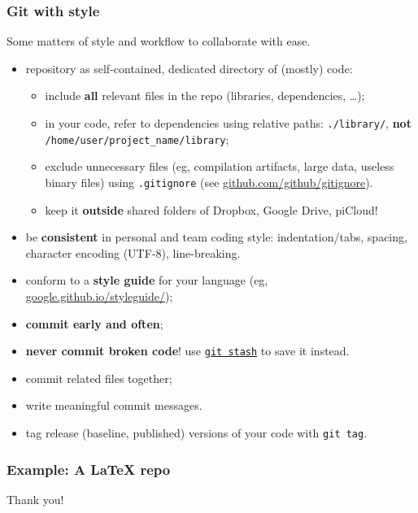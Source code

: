 \documentclass[10pt,svgnames,handout]{beamer}
\begin{document}
\begin{frame}
\label{style}
\frametitle{Git with style}

Some matters of style and workflow to collaborate with ease.

\begin{itemize}[<+->]
\item repository as self-contained, dedicated directory of (mostly) code:
\begin{itemize}
  \item include \textbf{all} relevant files in the repo (libraries, dependencies, \ldots);
  \item in your code, refer to dependencies using relative paths: \lstinline{./library/}, \textbf{not} \lstinline{/home/user/project_name/library};
  \item exclude unnecessary files (eg, compilation artifacts, large data, useless binary files) using \texttt{.gitignore} (see \href{https://github.com/github/gitignore}{github.com/github/gitignore}).
  \item keep it \textbf{outside} shared folders of Dropbox, Google Drive, piCloud!
\end{itemize}
\item be \textbf{consistent} in personal and team coding style: indentation/tabs, spacing, character encoding (UTF-8), line-breaking.
\item conform to a \textbf{style guide} for your language (eg, \href{https://google.github.io/styleguide/}{google.github.io/styleguide/});
\item \textbf{commit early and often};
\item \textbf{never commit broken code}! use \href{https://git-scm.com/book/it/v2/Git-Tools-Stashing-and-Cleaning}{\lstinline{git stash}} to save it instead.
\item commit related files together;
\item write meaningful commit messages.
\item tag release (baseline, published) versions of your code with \lstinline{git tag}.
\end{itemize}

\end{frame}

\begin{frame}
\frametitle{Example: A LaTeX repo}


\end{frame}




\begin{frame}[standout]
Thank you!
\end{frame}
\end{document}
